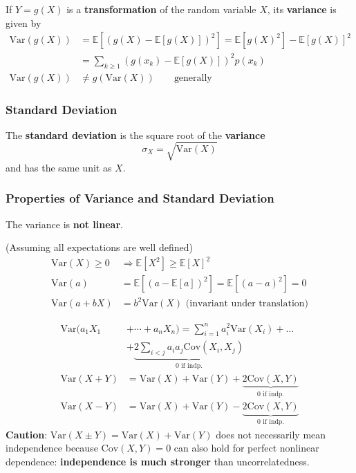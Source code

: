 \newpar{}
If $Y=g(X)$ is a \textbf{transformation} of the random variable $X$, its \textbf{variance} is given by
\noindent\begin{align*}
    \mathrm{Var}(g(X)) & =\mathbb{E}[{(g(X)-\mathbb{E}[g(X)])}^{2}]   = \mathbb{E}[{g(X)}^2]-{\mathbb{E}[g(X)]}^2 \\
                       & =\sum_{k\geq1}{(g(x_{k})-\mathbb{E}[g(X)])}^{2}p(x_{k})                                  \\
    \mathrm{Var}(g(X)) & \neq g(\mathrm{Var}(X)) \qquad \text{generally}
\end{align*}

\subsubsection{Standard Deviation}
The \textbf{standard deviation} is the square root of the \textbf{variance}
\noindent\begin{equation*}
    \sigma_{X}=\sqrt{\mathrm{Var}(X)}
\end{equation*}
and has the same unit as $X$.

\subsubsection{Properties of Variance and Standard Deviation}

The variance is \textbf{not linear}.

(Assuming all expectations are well defined)
\noindent\begin{align*}
    \mathrm{Var}(X)\geq0 & \Rightarrow\mathbb{E}[X^{2}]\geq{\mathbb{E}[X]}^{2}        \\
    \mathrm{Var}(a)      & =\mathbb{E}[{(a-\mathbb{E}[a])}^2]=\mathbb{E}[{(a-a)}^2]=0 \\
    \mathrm{Var}(a+bX)   & = b^2\mathrm{Var}(X)\text{ (invariant under translation)}
\end{align*}

\noindent\begin{align*}
    \mathrm{Var}(a_1X_1 & +\cdots+a_n X_n)  =\sum_{i=1}^{n}a_{i}^{2}\mathrm{Var}(X_{i})+\ldots                  \\
                        & + \underbrace{2\sum_{i<j}a_{i}a_{j}\mathrm{Cov}(X_{i},X_{j})}_{0\text{ if indp.}}     \\
    \mathrm{Var}(X+Y)   & =\mathrm{Var}(X)+\mathrm{Var}(Y)+ \underbrace{2\mathrm{Cov}(X,Y)}_{0\text{ if indp.}} \\
    \mathrm{Var}(X-Y)   & =\mathrm{Var}(X)+\mathrm{Var}(Y)-\underbrace{2\mathrm{Cov}(X,Y)}_{0\text{ if indp.}}
\end{align*}
\textbf{Caution}: $\mathrm{Var}(X\pm Y) = \mathrm{Var}(X)+\mathrm{Var}(Y)$ does not necessarily mean independence because $\mathrm{Cov}(X,Y)=0$ can also hold for perfect nonlinear dependence: \textbf{independence is much stronger} than uncorrelatedness.

